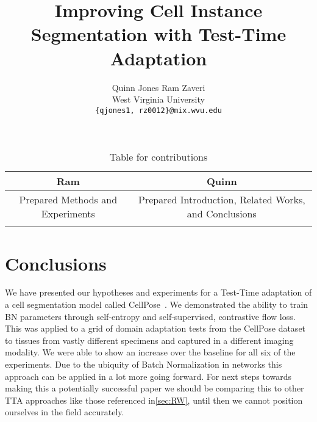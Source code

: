 \documentclass[10pt,twocolumn,letterpaper]{article}
\author{Quinn Jones \qquad Ram Zaveri \\
West Virginia University\\
{\tt\small \{qjones1, rz0012\}@mix.wvu.edu}
}
\begin{document}
\begin{table}[h]
\centering
\begin{tabular}{|c|c|}
\hline
\textbf{Ram} & \textbf{Quinn} \\ \hline
 Prepared Methods and Experiments   & 
 Prepared Introduction, Related Works, and Conclusions
\\ \hline
 &   \\
 \hline
\end{tabular}
\caption{Table for contributions}
\label{tab:ram_quinn}
\end{table}


\pagebreak\pagebreak
\title{Improving Cell Instance Segmentation with Test-Time Adaptation}
\maketitle
    





\section{Conclusions}
We have presented our hypotheses and experiments for a Test-Time adaptation of a cell segmentation model called CellPose~\cite{stringer2021cellpose}. We demonstrated the ability to train BN parameters through self-entropy and self-supervised, contrastive flow loss.  This was applied to a grid of domain adaptation tests from the CellPose dataset to tissues from vastly different specimens and captured in a different imaging modality. We were able to show an increase over the baseline for all six of the experiments.   Due to the ubiquity of Batch Normalization in networks this approach can be applied in a lot more going forward.  For next steps towards making this a potentially successful paper we should be comparing this to other TTA approaches like those referenced in\ref{sec:RW}, until then we cannot position ourselves in the field accurately. 


{
    \small
    
    
}

% 
\end{document}
